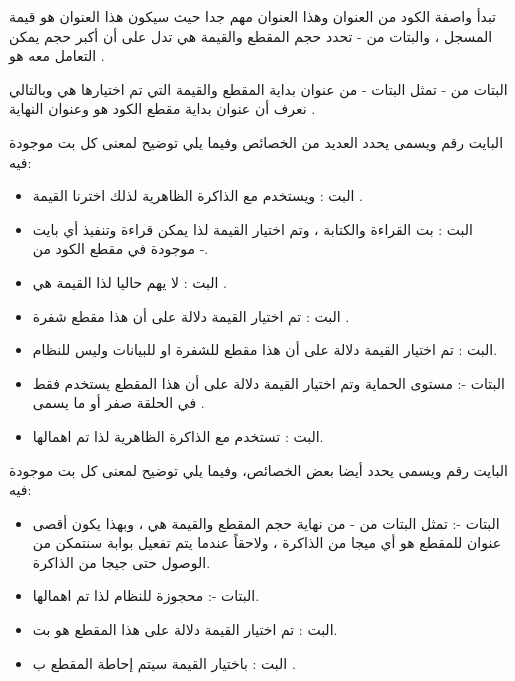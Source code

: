 \documentclass[document.tex]{subfiles}
\begin{document}
تبدأ واصفة الكود  من العنوان  وهذا العنوان مهم جدا حيث سيكون هذا العنوان هو قيمة المسجل  ، والبتات من - تحدد حجم المقطع  والقيمة هي  تدل على أن أكبر حجم يمكن التعامل معه هو .

البتات من - تمثل البتات - من عنوان بداية المقطع  والقيمة التي تم اختيارها هي  وبالتالي نعرف أن عنوان بداية مقطع الكود هو  وعنوان النهاية  .

البايت رقم  ويسمى  يحدد العديد من الخصائص وفيما يلي توضيح لمعنى كل بت موجودة فيه:
\begin{itemize}
\item البت :  ويستخدم مع الذاكرة الظاهرية لذلك اخترنا القيمة .
\item البت : بت القراءة والكتابة ، وتم اختيار القيمة  لذا يمكن قراءة وتنفيذ أي بايت موجودة في مقطع الكود من -.
\item البت :  لا يهم حاليا لذا القيمة هي .
\item البت : تم اختيار القيمة  دلالة على أن هذا مقطع شفرة .
\item البت : تم اختيار القيمة  دلالة على أن هذا مقطع للشفرة او للبيانات وليس للنظام.
\item البتات -: مستوى الحماية وتم اختيار القيمة  دلالة على أن هذا المقطع يستخدم فقط في الحلقة صفر  أو ما يسمى .
\item البت : تستخدم مع الذاكرة الظاهرية لذا تم اهمالها.
\end{itemize}

البايت رقم  ويسمى  يحدد أيضا بعض الخصائص، وفيما يلي توضيح لمعنى كل بت موجودة فيه:

\begin{itemize}
\item البتات -: تمثل البتات من - من نهاية حجم المقطع  والقيمة هي  ، وبهذا يكون أقصى عنوان للمقطع هو  أي  ميجا من الذاكرة ، ولاحقاً عندما يتم تفعيل بوابة  سنتمكن من الوصول حتى  جيجا من الذاكرة.

\item البتات -: محجوزة للنظام لذا تم اهمالها.
\item البت : تم اختيار القيمة  دلالة على هذا المقطع هو  بت.
\item البت : باختيار القيمة  سيتم إحاطة المقطع ب .

\end{itemize}
\end{document}
